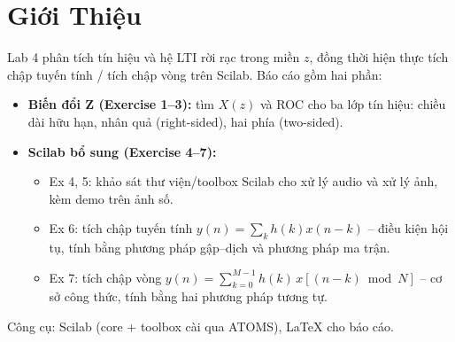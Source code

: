 \section{Giới Thiệu}
Lab 4 phân tích tín hiệu và hệ LTI rời rạc trong miền $z$, đồng thời hiện thực tích chập tuyến tính / tích chập vòng trên Scilab. Báo cáo gồm hai phần:

\begin{itemize}
    \item \textbf{Biến đổi Z (Exercise 1--3):} tìm $X(z)$ và ROC cho ba lớp tín hiệu: chiều dài hữu hạn, nhân quả (right-sided), hai phía (two-sided).
    \item \textbf{Scilab bổ sung (Exercise 4--7):}
    \begin{itemize}
        \item Ex 4, 5: khảo sát thư viện/toolbox Scilab cho xử lý audio và xử lý ảnh, kèm demo trên ảnh số.
        \item Ex 6: tích chập tuyến tính $y(n) = \sum_k h(k)x(n-k)$ -- điều kiện hội tụ, tính bằng phương pháp gập--dịch và phương pháp ma trận.
        \item Ex 7: tích chập vòng $y(n) = \sum_{k=0}^{M-1} h(k)\,x[(n-k) \bmod N]$ -- cơ sở công thức, tính bằng hai phương pháp tương tự.
    \end{itemize}
\end{itemize}

\noindent Công cụ: Scilab (core + toolbox cài qua ATOMS), \LaTeX{} cho báo cáo.

